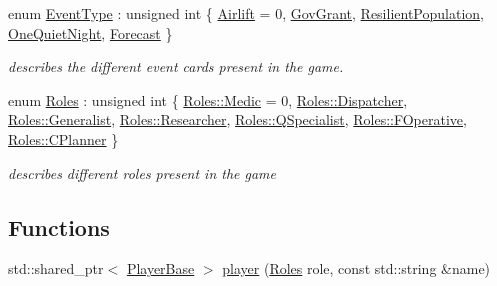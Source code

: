 \begin{DoxyCompactItemize}
\item 
enum \hyperlink{namespacepan_a9221a73b34e019e6b8fe6f84e6417513}{Event\+Type} \+: unsigned int \{ \newline
\hyperlink{namespacepan_a9221a73b34e019e6b8fe6f84e6417513a4d83f184b10ed4c47d6a870a2a4e6d70}{Airlift} = 0, 
\hyperlink{namespacepan_a9221a73b34e019e6b8fe6f84e6417513a977c2c35d6409d01572a7c9488a2b37d}{Gov\+Grant}, 
\hyperlink{namespacepan_a9221a73b34e019e6b8fe6f84e6417513aa78611025144b70c6f550645196ab0a5}{Resilient\+Population}, 
\hyperlink{namespacepan_a9221a73b34e019e6b8fe6f84e6417513a42efb031a64c66ce03a9694dc8aaf8fd}{One\+Quiet\+Night}, 
\newline
\hyperlink{namespacepan_a9221a73b34e019e6b8fe6f84e6417513a724312814497ba102c07b7c35b9a1a66}{Forecast}
 \}\begin{DoxyCompactList}\small\item\em describes the different event cards present in the game. \end{DoxyCompactList}
\item 
enum \hyperlink{namespacepan_a5017f84fa51152eae453759537d1ced6}{Roles} \+: unsigned int \{ \newline
\hyperlink{namespacepan_a5017f84fa51152eae453759537d1ced6a9e41f6e7578581eac9832bcd68732ae1}{Roles\+::\+Medic} = 0, 
\hyperlink{namespacepan_a5017f84fa51152eae453759537d1ced6adbfcc2e96980bb87c34df3809193c62a}{Roles\+::\+Dispatcher}, 
\hyperlink{namespacepan_a5017f84fa51152eae453759537d1ced6a824390b43737bdd9821c864af71f1f86}{Roles\+::\+Generalist}, 
\hyperlink{namespacepan_a5017f84fa51152eae453759537d1ced6ae333508b3f7d851e40075d1eb5a0eae8}{Roles\+::\+Researcher}, 
\newline
\hyperlink{namespacepan_a5017f84fa51152eae453759537d1ced6ae0f77fedb512beb1711d43d21dc3aa47}{Roles\+::\+Q\+Specialist}, 
\hyperlink{namespacepan_a5017f84fa51152eae453759537d1ced6a97b293ec5041fbbf87730876a2d388c5}{Roles\+::\+F\+Operative}, 
\hyperlink{namespacepan_a5017f84fa51152eae453759537d1ced6a700cdc83d708e11cb7a564a8f47f06f2}{Roles\+::\+C\+Planner}
 \}\begin{DoxyCompactList}\small\item\em describes different roles present in the game \end{DoxyCompactList}
\end{DoxyCompactItemize}
\subsection*{Functions}
\begin{DoxyCompactItemize}
\item 
std\+::shared\+\_\+ptr$<$ \hyperlink{classpan_1_1_player_base}{Player\+Base} $>$ \hyperlink{namespacepan_a9cba06f35904752ede423c15355cf307}{player} (\hyperlink{namespacepan_a5017f84fa51152eae453759537d1ced6}{Roles} role, const std\+::string \&name)
\end{DoxyCompactItemize}



